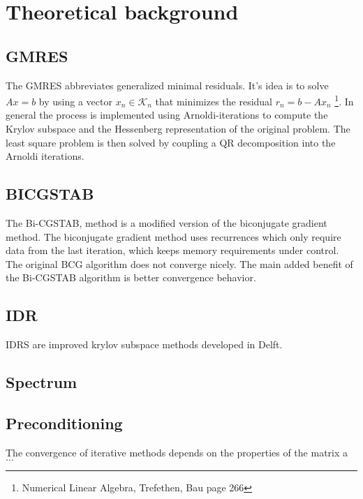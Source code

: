 \section{Theoretical background}
\subsection{GMRES}
The GMRES abbreviates generalized minimal residuals. It's idea is to solve $Ax = b$ by using a vector
$x_n \in \mathcal{K}_n$ that minimizes the residual $r_n = b - Ax_n$ \footnote{Numerical Linear Algebra, Trefethen, Bau page 266}.
In general the process is implemented using Arnoldi-iterations to compute the Krylov subspace and the Hessenberg representation of the
original problem. The least square problem is then solved by coupling a QR decomposition into the Arnoldi iterations. 

\subsection{BICGSTAB}
The Bi-CGSTAB, method is a modified version of the biconjugate gradient method. The biconjugate gradient method uses recurrences which only
require data from the last iteration, which keeps memory requirements under control. The original BCG algorithm does not converge 
nicely. The main added benefit of the Bi-CGSTAB algorithm is better convergence behavior. 


\subsection{IDR}
IDRS are improved krylov subspace methods developed in Delft.

\subsection{Spectrum}


\subsection{Preconditioning}
The convergence of iterative methods depends on the properties of the matrix a $\dots$